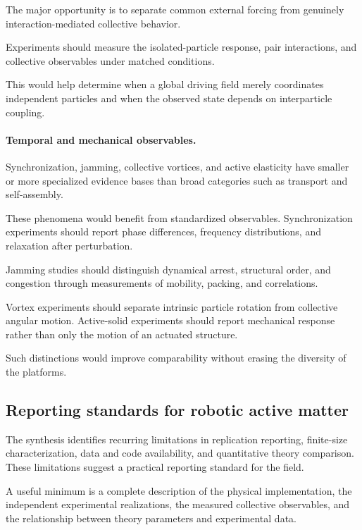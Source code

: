 The major opportunity is to
separate common external forcing
from genuinely interaction-mediated
collective behavior.

Experiments should measure the
isolated-particle response,
pair interactions, and
collective observables
under matched conditions.

This would help determine when
a global driving field merely
coordinates independent particles
and when the observed state
depends on interparticle coupling.

\paragraph*{Temporal and mechanical observables.}

Synchronization, jamming,
collective vortices,
and active elasticity
have smaller or more
specialized evidence bases
than broad categories such as
transport and self-assembly.

These phenomena would benefit
from standardized observables.
Synchronization experiments
should report phase differences,
frequency distributions,
and relaxation after perturbation.

Jamming studies should distinguish
dynamical arrest,
structural order,
and congestion through
measurements of mobility,
packing, and correlations.

Vortex experiments should separate
intrinsic particle rotation
from collective angular motion.
Active-solid experiments should
report mechanical response
rather than only the motion
of an actuated structure.

Such distinctions would improve
comparability without erasing
the diversity of the platforms.

\subsection{Reporting standards for robotic active matter}
\label{sec:outlook-reporting}

The synthesis identifies recurring limitations in
replication reporting, finite-size characterization,
data and code availability, and quantitative
theory comparison. These limitations suggest
a practical reporting standard for the field.

A useful minimum is a complete description
of the physical implementation,
the independent experimental realizations,
the measured collective observables,
and the relationship between theory
parameters and experimental data.

